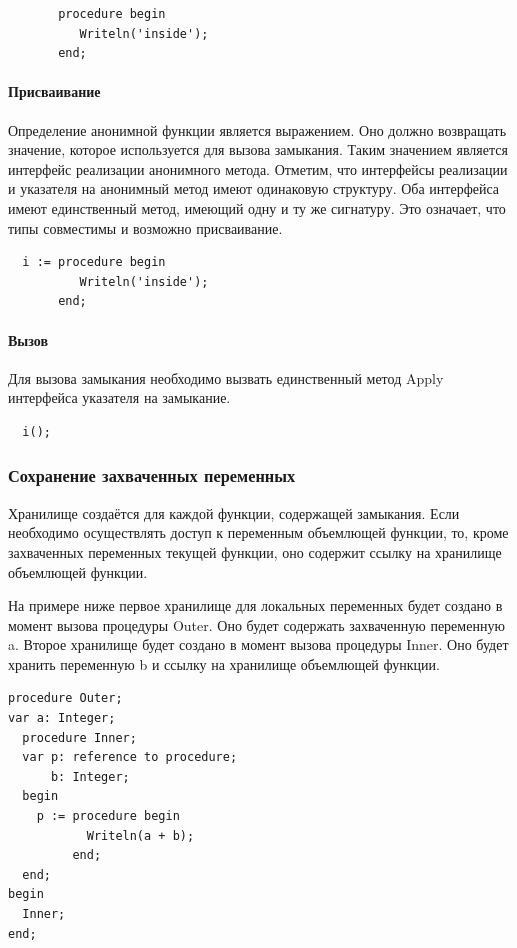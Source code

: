\documentclass{imcs}
\begin{document}
\begin{lstlisting}
       procedure begin
          Writeln('inside');
       end;
\end{lstlisting}


\paragraph{Присваивание}

Определение анонимной функции является выражением. Оно должно возвращать значение, которое
используется для вызова замыкания. Таким значением является интерфейс реализации анонимного
метода. Отметим, что интерфейсы реализации и указателя на анонимный метод имеют одинаковую
структуру. Оба интерфейса имеют единственный метод, имеющий одну и ту же сигнатуру. 
Это означает, что типы совместимы и возможно присваивание.

\begin{lstlisting}
  i := procedure begin
          Writeln('inside');
       end;
\end{lstlisting}

\paragraph{Вызов}

Для вызова замыкания необходимо вызвать единственный метод Apply интерфейса указателя на замыкание.

\begin{lstlisting}
  i();
\end{lstlisting}

\subsubsection{Сохранение захваченных переменных}

Хранилище создаётся для каждой функции, содержащей замыкания. Если необходимо
осуществлять доступ к переменным объемлющей функции, то, кроме захваченных
переменных текущей функции, оно содержит ссылку на хранилище объемлющей функции.

На примере ниже первое хранилище для локальных переменных будет создано в момент вызова процедуры
Outer. Оно будет содержать захваченную
переменную a. Второе хранилище будет создано в момент вызова процедуры Inner. Оно будет
хранить переменную b и ссылку на хранилище объемлющей функции.

\begin{lstlisting}
procedure Outer;
var a: Integer;
  procedure Inner;
  var p: reference to procedure;
      b: Integer;
  begin
    p := procedure begin
           Writeln(a + b);
         end;
  end;
begin
  Inner;
end;
  
\end{lstlisting}
\end{document}
